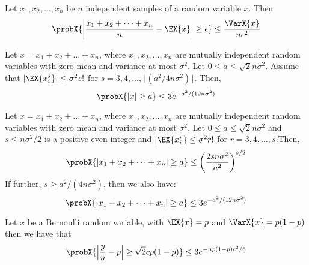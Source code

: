 \documentclass{article}
\begin{document}
\begin{theorem}
  Let $x_1,x_2,\dots, x_n$ be $n$ independent samples of a random variable $x$. Then
  \begin{equation*}
    \probX{\left|\frac{x_1 + x_2 + \dots + x_n}{n} - \EX{x}\right| \geq \epsilon} \leq \frac{\VarX{x}}{n\epsilon^2}
  \end{equation*}
\end{theorem}
\begin{theorem}
  Let $x = x_1 + x_2 + \dots + x_n$, where $x_1,x_2,\dots,x_n$ are mutually independent random variables with zero mean and variance at most $\sigma^2$. Let $0 \leq a \leq \sqrt{2}n\sigma^2$. Assume that $|\EX{x_i^s}| \leq \sigma^2 s!$ for $s = 3,4,\dots, \lfloor(a^2/4n\sigma^2)\rfloor$. Then,
  \begin{equation*}
    \probX{|x| \geq a} \leq 3e^{-a^2/(12n\sigma^2)}
  \end{equation*}
\end{theorem}

\begin{theorem}
  Let $x = x_1 + x_2 + \dots + x_n$, where $x_1,x_2,\dots,x_n$ are mutually independent random variables with zero mean and variance at most $\sigma^2$. Let $0 \leq a \leq \sqrt{2}n\sigma^2$ and $s \leq n\sigma^2/2$ is a positive even integer and $|\EX{x_i^r} \leq \sigma^2 r!$ for $r = 3,4,\dots,s$.Then,
  \begin{equation*}
    \probX{|x_1 + x_2 + \dots + x_n| \geq a} \leq \left(\frac{2sn\sigma^2}{a^2}\right)^{s/2}
  \end{equation*}
  If further, $s \geq a^2/(4n\sigma^2)$, then we also have:
  \begin{equation*}
    \probX{|x_1 + x_2 + \dots + x_n| \geq a} \leq 3e^{-a^2/(12n\sigma^2)}
  \end{equation*}
\end{theorem}

\begin{theorem}
  Let $x$ be a Bernoulli random variable, with $\EX{x} = p$ and $\VarX{x} = p(1-p)$ then we have that
  \begin{equation*}
    \probX{\left|\frac{y}{n} - p \right| \geq \sqrt{2}c p(1-p)} \leq 3 e^{-np(1-p)c^2/6}
  \end{equation*}
\end{theorem}






\end{document}
